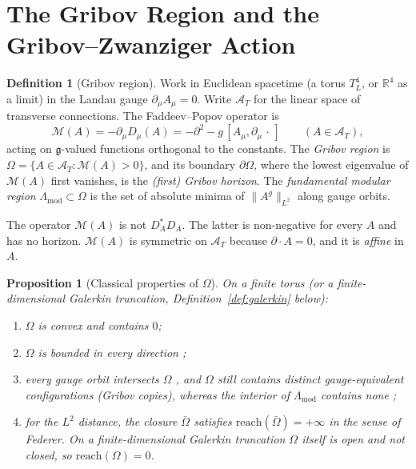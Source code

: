\documentclass[11pt,a4paper]{amsart}
\newtheorem{proposition}[theorem]{Proposition}
\theoremstyle{definition}
\newtheorem{definition}[theorem]{Definition}
\newcommand{\R}{\mathbb{R}}
\newcommand{\cA}{\mathcal{A}}
\newcommand{\reach}{\mathrm{reach}}
\begin{document}
\section{The Gribov Region and the Gribov--Zwanziger Action}

\begin{definition}[Gribov region]
\label{def:gribov}
Work in Euclidean spacetime (a torus $T^4_L$, or $\R^4$ as a limit) in the Landau gauge $\partial_\mu A_\mu = 0$. Write $\cA_T$ for the linear space of transverse connections. The Faddeev--Popov operator is
\begin{equation}
    \mathcal{M}(A) = -\partial_\mu D_\mu(A) = -\partial^2 - g\,[A_\mu, \partial_\mu\, \cdot\,] \qquad (A \in \cA_T),
\end{equation}
acting on $\mathfrak{g}$-valued functions orthogonal to the constants. The \emph{Gribov region} is $\Omega = \{A \in \cA_T : \mathcal{M}(A) > 0\}$, and its boundary $\partial\Omega$, where the lowest eigenvalue of $\mathcal{M}(A)$ first vanishes, is the \emph{(first) Gribov horizon}. The \emph{fundamental modular region} $\Lambda_{\mathrm{mod}} \subset \Omega$ is the set of absolute minima of $\|A^g\|_{L^2}$ along gauge orbits.
\end{definition}

The operator $\mathcal{M}(A)$ is not $D_A^* D_A$. The latter is non-negative for every $A$ and has no horizon. $\mathcal{M}(A)$ is symmetric on $\cA_T$ because $\partial\cdot A = 0$, and it is \emph{affine} in $A$.

\begin{proposition}[Classical properties of $\Omega$]
\label{prop:gribov_region}
On a finite torus (or a finite-dimensional Galerkin truncation, Definition~\ref{def:galerkin} below):
\begin{enumerate}[label=(\alph*)]
    \item $\Omega$ is convex and contains $0$;
    \item $\Omega$ is bounded in every direction \cite{zwanziger1982nonperturbative, dell1989ellipsoidal};
    \item every gauge orbit intersects $\Omega$ \cite{dell1991every}, and $\Omega$ still contains distinct gauge-equivalent configurations (Gribov copies), whereas the interior of $\Lambda_{\mathrm{mod}}$ contains none \cite{vanbaal1992more, vandersickel2012gribov};
    \item for the $L^2$ distance, the closure $\bar{\Omega}$ satisfies $\reach(\bar{\Omega}) = +\infty$ in the sense of Federer. On a finite-dimensional Galerkin truncation $\Omega$ itself is open and not closed, so $\reach(\Omega) = 0$.
\end{enumerate}
\end{proposition}
\end{document}
